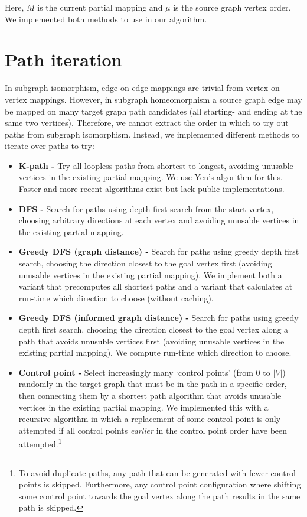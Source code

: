 Here, $M$ is the current partial mapping and $\mu$ is the source graph vertex order. We implemented both methods to use in our algorithm.

\section{Path iteration}
\label{sec:pathIterationShort}
In subgraph isomorphism, edge-on-edge mappings are trivial from vertex-on-vertex mappings. However, in subgraph homeomorphism a source graph edge may be mapped on many target graph path candidates (all starting- and ending at the same two vertices). Therefore, we cannot extract the order in which to try out paths from subgraph isomorphism. Instead, we implemented different methods to iterate over paths to try:

\begin{itemize}
\item \textbf{K-path -} Try all loopless paths from shortest to longest, avoiding unusable vertices in the existing partial mapping. We use Yen's algorithm\cite{YensAlgorithm} for this. Faster and more recent algorithms exist\cite{Hershberger, Brander1996} but lack public implementations.

\item \textbf{DFS -} Search for paths using depth first search from the start vertex, choosing arbitrary directions at each vertex and avoiding unusable vertices in the existing partial mapping.

\item \textbf{Greedy DFS (graph distance) -} Search for paths using greedy depth first search, choosing the direction closest to the goal vertex first (avoiding unusable vertices in the existing partial mapping). We implement both a variant that precomputes all shortest paths and a variant that calculates at run-time which direction to choose (without caching).

\item \textbf{Greedy DFS (informed graph distance) -} Search for paths using greedy depth first search, choosing the direction closest to the goal vertex along a path that avoids unusuble vertices first (avoiding unusable vertices in the existing partial mapping). We compute run-time which direction to choose.

\item \textbf{Control point -} Select increasingly many `control points' (from $0$ to $|V|$) randomly in the target graph that must be in the path in a specific order, then connecting them by a shortest path algorithm that avoids unusable vertices in the existing partial mapping. We implemented this with a recursive algorithm in which a replacement of some control point is only attempted if all control points \textit{earlier} in the control point order have been attempted.\footnote{To avoid duplicate paths, any path that can be generated with fewer control points is skipped. Furthermore, any control point configuration where shifting some control point towards the goal vertex along the path results in the same path is skipped.}
\end{itemize}

